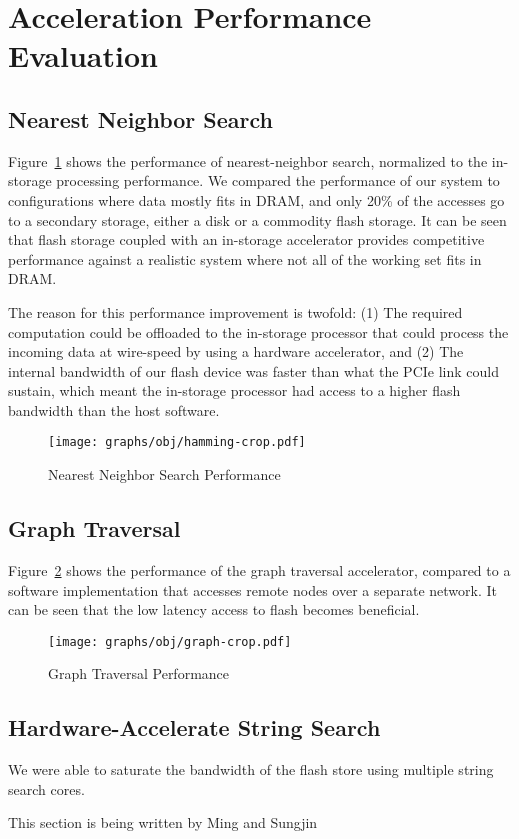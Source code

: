 \section{Acceleration Performance Evaluation}
\label{sec:results_acceleration}

\subsection{Nearest Neighbor Search}
Figure~\ref{fig:result_hamming} shows the performance of nearest-neighbor search,
normalized to the in-storage processing performance. We compared the performance
of our system to configurations where data mostly fits in DRAM, and only 20\% of the
accesses go to a secondary storage, either a disk or a commodity flash storage.
It can be seen that flash storage coupled with an in-storage accelerator
provides competitive performance against a realistic system where not all of the
working set fits in DRAM. 

The reason for this performance improvement is
twofold: (1) The required computation could be offloaded to the in-storage processor
that could process the incoming data at wire-speed by using a hardware
accelerator, and (2) The internal bandwidth of our flash device was faster than
what the PCIe link could sustain, which meant the in-storage processor had
access to a higher flash bandwidth than the host software.


\begin{figure}[h]
	\begin{center}
	\texttt{[image: graphs/obj/hamming-crop.pdf]}
	\caption{Nearest Neighbor Search Performance}
	\label{fig:result_hamming}
	\end{center}
\end{figure}

\subsection{Graph Traversal}

Figure~\ref{fig:result_graph} shows the performance of the graph traversal
accelerator, compared to a software implementation that accesses remote nodes
over a separate network. It can be seen that the low latency access to flash
becomes beneficial.

\begin{figure}[h]
	\begin{center}
	\texttt{[image: graphs/obj/graph-crop.pdf]}
	\caption{Graph Traversal Performance}
	\label{fig:result_graph}
	\end{center}
\end{figure}



\subsection{Hardware-Accelerate String Search}

We were able to saturate the bandwidth of the flash store using multiple string
search cores.

This section is being written by Ming and Sungjin

